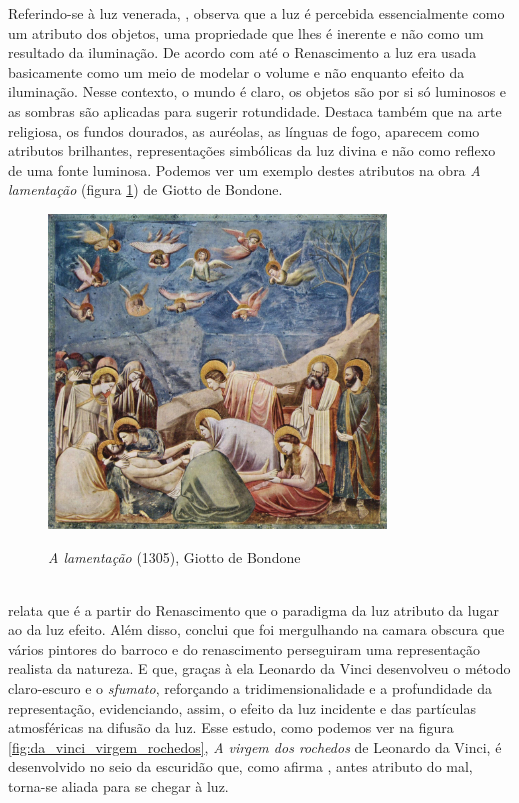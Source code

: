 Referindo-se à luz venerada, , observa que a luz é percebida essencialmente como um atributo dos objetos, uma propriedade que lhes é inerente e não como um resultado da iluminação. De acordo com  até o Renascimento a luz era usada basicamente como um meio de modelar o volume e não enquanto efeito da iluminação. Nesse contexto, o mundo é claro, os objetos são por si só luminosos e as sombras são aplicadas para sugerir rotundidade. Destaca também que na arte religiosa, os fundos dourados, as auréolas, as línguas de fogo, aparecem como atributos brilhantes, representações simbólicas da luz divina e não como reflexo de uma fonte luminosa. Podemos ver um exemplo destes atributos na obra \textit{A lamentação} (figura \ref{fig:giotto_lamentacao}) de Giotto de Bondone.

\begin{figure}[H]
    \centering
    \caption{\textit{A lamentação} (1305), Giotto de Bondone}
	\vspace*{0,2cm}
    \includegraphics[width=0.8\textwidth]{./04-figuras/giotto_lamentacao}
    \label{fig:giotto_lamentacao}
\end{figure}
\vspace*{-0,9cm}
{\raggedright {}}\\

 relata que é a partir do Renascimento que o paradigma da luz atributo da lugar ao da luz efeito. Além disso, conclui que foi mergulhando na camara obscura que vários pintores do barroco e do renascimento perseguiram uma representação realista da natureza. E que, graças à ela Leonardo da Vinci desenvolveu o método claro-escuro e o \textit{sfumato}, reforçando a tridimensionalidade e a profundidade da representação, evidenciando, assim, o efeito da luz incidente e das partículas atmosféricas na difusão da luz. Esse estudo,  como podemos ver na figura \ref{fig:da_vinci_virgem_rochedos}, \textit{A virgem dos rochedos} de Leonardo da Vinci, é desenvolvido no seio da escuridão que, como afirma , antes atributo do mal, torna-se aliada para se chegar à luz.

